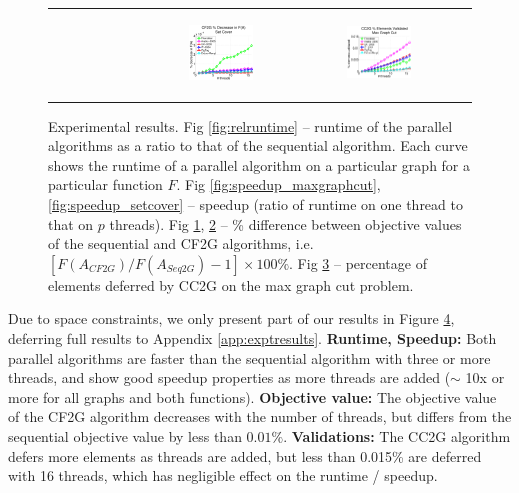\documentclass{article} %
\newcommand{\hogwild}{CF2G}
\newcommand{\occ}{CC2G}
\newcommand{\seqalg}{Seq2G}
\begin{document}
\begin{figure}[ht]
\begin{tabular}{cccc}
\begin{subfigure}[h]{0.30\textwidth}
			\caption{}
			\label{fig:difffa_maxgraphcut}
	  \end{subfigure} &
	  \begin{subfigure}[h]{0.30\textwidth}
	  	\includegraphics[width=130pt]{images/summary_diffFA_setcover.pdf}
			\caption{}
			\label{fig:difffa_setcover}
	  \end{subfigure} &
	  \begin{subfigure}[h]{0.30\textwidth}
	  	\includegraphics[width=130pt]{images/summary_validated_maxgraphcut.pdf}
			\caption{}
			\label{fig:validated_maxgraphcut}
	  \end{subfigure} \\
  \end{tabular}
  \caption{\footnotesize Experimental results.
  Fig \ref{fig:relruntime} -- runtime of the parallel algorithms as a ratio to that of the sequential algorithm. Each curve shows the runtime of a parallel algorithm on a particular graph for a particular function $F$.
  Fig \ref{fig:speedup_maxgraphcut}, \ref{fig:speedup_setcover} -- speedup (ratio of runtime on one thread to that on $p$ threads).
  Fig \ref{fig:difffa_maxgraphcut}, \ref{fig:difffa_setcover} -- \% difference between objective values of the sequential and \hogwild{} algorithms, i.e. $[F(A_{\hogwild{}}) / F(A_{\seqalg}) - 1] \times 100\%$.
  Fig \ref{fig:validated_maxgraphcut} -- percentage of elements deferred by \occ{} on the max graph cut problem.
  }
\label{fig:results_quality}
\end{figure}


Due to space constraints, we only present part of our results in Figure \ref{fig:results_quality}, deferring full results to Appendix \ref{app:exptresults}.
\textbf{Runtime, Speedup:} Both parallel algorithms are faster than the sequential algorithm with three or more threads, and show good speedup properties as more threads are added ($\sim$ 10x or more for all graphs and both functions).
\textbf{Objective value:} The objective value of the \hogwild{} algorithm decreases with the number of threads, but differs from the sequential objective value by less than $0.01\%$.
\textbf{Validations:} The \occ{} algorithm defers more elements as threads are added, but less than 0.015\% are deferred with 16 threads, which has negligible effect on the runtime / speedup.
\end{document}
